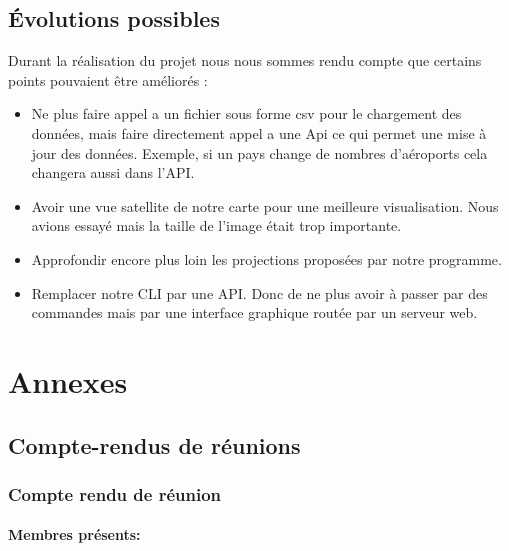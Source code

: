 \documentclass[a4paper, 12pt]{report}
\begin{document}
    \chapter{Évolutions possibles} %
    Durant la réalisation du projet nous nous sommes rendu compte que certains points pouvaient être améliorés :
    \begin{itemize}
        \item Ne plus faire appel a un fichier sous forme csv pour le chargement des données, mais faire directement appel a une Api ce qui permet une mise à jour des données. Exemple, si un pays change de nombres d'aéroports cela changera aussi dans l'API.
        \item Avoir une vue satellite de notre carte pour une meilleure visualisation. Nous avions essayé mais la taille de l'image était trop importante.
        \item Approfondir encore plus loin les projections proposées par notre programme.
        \item Remplacer notre CLI par une API. Donc de ne plus avoir à passer par des commandes mais par une interface graphique routée par un serveur web.
    \end{itemize}

    

\part*{Annexes}\label{part:annexes}

\chapter{Compte-rendus de réunions}


\section{Compte rendu de réunion }
\subsection*{Membres présents:}
\end{document}
